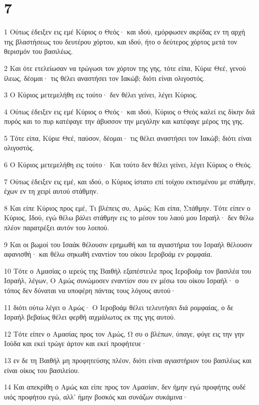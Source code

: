 \chapter{7}

\par 1 Ούτως έδειξεν εις εμέ Κύριος ο Θεός· και ιδού, εμόρφωσεν ακρίδας εν τη αρχή της βλαστήσεως του δευτέρου χόρτου, και ιδού, ήτο ο δεύτερος χόρτος μετά τον θερισμόν του βασιλέως.
\par 2 Και ότε ετελείωσαν να τρώγωσι τον χόρτον της γης, τότε είπα, Κύριε Θεέ, γενού ίλεως, δέομαι· τις θέλει αναστήσει τον Ιακώβ; διότι είναι ολιγοστός.
\par 3 Ο Κύριος μετεμελήθη εις τούτο· δεν θέλει γείνει, λέγει Κύριος.
\par 4 Ούτως έδειξεν εις εμέ Κύριος ο Θεός· και ιδού, Κύριος ο Θεός καλεί εις δίκην διά πυρός και το πυρ κατέφαγε την άβυσσον την μεγάλην και κατέφαγε μέρος της γης.
\par 5 Τότε είπα, Κύριε Θεέ, παύσον, δέομαι· τις θέλει αναστήσει τον Ιακώβ; διότι είναι ολιγοστός.
\par 6 Ο Κύριος μετεμελήθη εις τούτο· Και τούτο δεν θέλει γείνει, λέγει Κύριος ο Θεός.
\par 7 Ούτως έδειξεν εις εμέ, και ιδού, ο Κύριος ίστατο επί τοίχου εκτισμένου με στάθμην, έχων εν τη χειρί αυτού στάθμην.
\par 8 Και είπε Κύριος προς εμέ, Τι βλέπεις συ, Αμώς; Και είπα, Στάθμην. Τότε είπεν ο Κύριος, Ιδού, εγώ θέλω βάλει στάθμην εις το μέσον του λαού μου Ισραήλ· δεν θέλω πλέον παρατρέξει αυτόν του λοιπού.
\par 9 Και οι βωμοί του Ισαάκ θέλουσιν ερημωθή και τα αγιαστήρια του Ισραήλ θέλουσιν αφανισθή· και θέλω σηκωθή εναντίον του οίκου Ιεροβοάμ εν ρομφαία.
\par 10 Τότε ο Αμασίας ο ιερεύς της Βαιθήλ εξαπέστειλε προς Ιεροβοάμ τον βασιλέα του Ισραήλ, λέγων, Ο Αμώς συνώμοσεν εναντίον σου εν μέσω του οίκου Ισραήλ· ο τόπος δεν δύναται να υποφέρη πάντας τους λόγους αυτού·
\par 11 διότι ούτω λέγει ο Αμώς· Ο Ιεροβοάμ θέλει τελευτήσει διά ρομφαίας, ο δε Ισραήλ βεβαίως θέλει φερθή αιχμάλωτος εκ της γης αυτού.
\par 12 Τότε είπεν ο Αμασίας προς τον Αμώς, Ω συ ο βλέπων, ύπαγε, φύγε εις την γην Ιούδα και εκεί τρώγε άρτον και εκεί προφήτευε·
\par 13 εν δε τη Βαιθήλ μη προφητεύσης πλέον, διότι είναι αγιαστήριον του βασιλέως και είναι οίκος του βασιλείου.
\par 14 Και απεκρίθη ο Αμώς και είπε προς τον Αμασίαν, δεν ήμην εγώ προφήτης ουδέ υιός προφήτου εγώ, αλλ' ήμην βοσκός και συνάζων συκάμινα·

